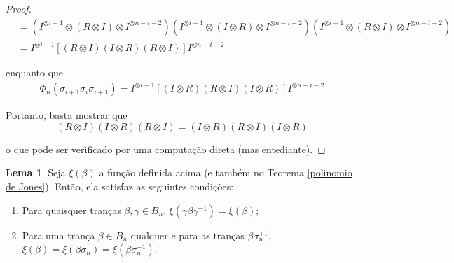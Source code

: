 \documentclass[a4paper,portuguese,11pt,twoside, leqno]{book}
\theoremstyle{definition}
\newtheorem{lemma}[theorem]{Lema}
\begin{document}
\begin{proof}
\begin{align*}
		&= (I^{\otimes i-1} \otimes (R\otimes I) \otimes I^{\otimes n-i-2}) (I^{\otimes i-1} \otimes (I\otimes R) \otimes I^{\otimes n-i-2}) (I^{\otimes i-1} \otimes (R \otimes I) \otimes I^{\otimes n-i-2}) \\
		&= I^{\otimes i-1}[(R \otimes I)(I \otimes R)(R \otimes I)]I^{\otimes n-i-2}
		\end{align*}
		\par\vspace{0.3cm} enquanto que
		\begin{align*}
		\Phi_n(\sigma_{i+1}\sigma_i\sigma_{i+1}) = I^{\otimes i-1}[(I \otimes R)(R \otimes I)(I \otimes R)]I^{\otimes n-i-2}
		\end{align*}
		\par\vspace{0.3cm} Portanto, basta mostrar que
		\begin{equation*}
		(R \otimes I)(I \otimes R)(R \otimes I) = (I \otimes R)(R \otimes I)(I \otimes R)
		\end{equation*}
		\par\vspace{0.3cm} o que pode ser verificado por uma computação direta (mas entediante).
	\end{proof}
	\begin{lemma}
		\label{lema 2 Jones}
		Seja $\xi(\beta)$ a função definida acima (e também no Teorema \eqref{polinomio de Jones}). Então, ela satisfaz as seguintes condições:
		\begin{enumerate}
			\item Para quaisquer tranças $\beta, \gamma\in B_n$, $\xi(\gamma\beta\gamma^{-1})=\xi(\beta)$;
			\item Para uma trança $\beta\in B_n$ qualquer e para as tranças $\beta\sigma_n^{\pm1}$, $\xi(\beta) = \xi(\beta\sigma_n) = \xi(\beta\sigma_n^{-1})$.
		\end{enumerate}
	\end{lemma}
\end{document}
